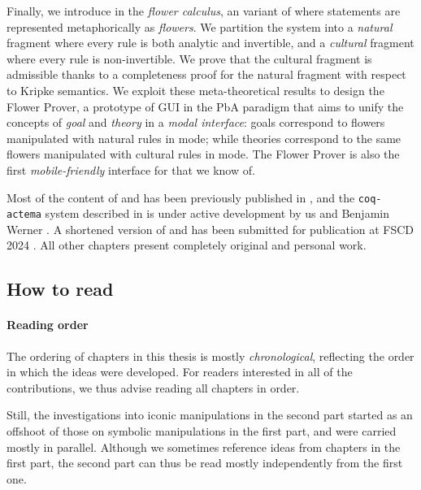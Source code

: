 \begin{description}
  Finally, we introduce in  the \emph{flower calculus}, an
   variant of  where statements are represented
  metaphorically as \emph{flowers}. We partition the system into a
  \emph{natural} fragment where every rule is both analytic and invertible, and
  a \emph{cultural} fragment where every rule is non-invertible. We prove that
  the cultural fragment is admissible thanks to a completeness proof for the
  natural fragment with respect to Kripke semantics. We exploit these
  meta-theoretical results to design the Flower Prover, a prototype of GUI in
  the PbA paradigm that aims to unify the concepts of \emph{goal} and
  \emph{theory} in a \emph{modal interface}: goals correspond to flowers
  manipulated with natural rules in \Proof mode; while theories correspond to
  the same flowers manipulated with cultural rules in \Edit mode. The Flower
  Prover is also the first \emph{mobile-friendly} interface for  that we
  know of.
\end{description}

\begin{kaonote}
Most of the content of  and  has been previously published
in \cite{10.1145/3497775.3503692}, and the \texttt{coq-actema} system described
in  is under active development by us and Benjamin Werner
\cite{coq-actema}. A shortened version of  and  has
been submitted for publication at FSCD 2024 . All other
chapters present completely original and personal work.
\end{kaonote}

\subsection{How to read}

\paragraph{Reading order}

The ordering of chapters in this thesis is mostly \emph{chronological},
reflecting the order in which the ideas were developed. For readers interested
in all of the contributions, we thus advise reading all chapters in order.

Still, the investigations into iconic manipulations in the second part started
as an offshoot of those on symbolic manipulations in the first part, and were
carried mostly in parallel. Although we sometimes reference ideas from chapters
in the first part, the second part can thus be read mostly independently from
the first one.

